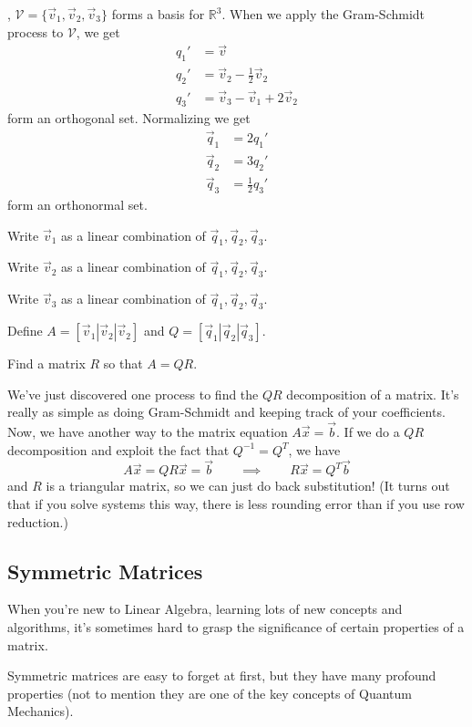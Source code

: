 \documentclass{article}
\newcommand{\R}{\mathbb{R}}
\begin{document}
	\sep
	$\mathcal V=\{\vec v_1,\vec v_2,\vec v_3\}$ forms a basis for $\R^3$.
	When we apply the Gram-Schmidt process to $\mathcal V$, we get
	\[
		\begin{array}{rl}
			q_1' &=\vec v\\
			q_2' &= \vec v_2-\frac{1}{2}\vec v_2\\
			q_3' &= \vec v_3-\vec v_1+2\vec v_2
		\end{array}
	\]
	form an orthogonal set.  Normalizing we get
	\[
		\begin{array}{rl}
			\vec q_1 &= 2q_1'\\
			\vec q_2 &= 3q_2'\\
			\vec q_3 &=\frac{1}{2}q_3'
		\end{array}
	\]
	form an orthonormal set.
	\begin{Enum}
		\item Write $\vec v_1$ as a linear combination of $\vec q_1,\vec q_2,\vec q_3$.
		\item Write $\vec v_2$ as a linear combination of $\vec q_1,\vec q_2,\vec q_3$.
		\item Write $\vec v_3$ as a linear combination of $\vec q_1,\vec q_2,\vec q_3$.
	\end{Enum}
	Define $A=[\vec v_1|\vec v_2|\vec v_2]$ and $Q=[\vec q_1|\vec q_2|\vec q_3]$.
	\begin{Enum}[resume]
		\item Find a matrix $R$ so that $A=QR$.
	\end{Enum}
	
	We've just discovered one process to find the $QR$ decomposition of a matrix.
	It's really as simple as doing Gram-Schmidt and keeping track of your coefficients.
	Now, we have another way to the matrix equation $A\vec x=\vec b$.  If we do a $QR$
	decomposition and exploit the fact that $Q^{-1}=Q^T$, we have
	\[
		A\vec x=QR\vec x=\vec b\qquad\implies\qquad R\vec x=Q^T\vec b
	\]
	and $R$ is a triangular matrix, so we can just do back substitution! (It turns
	out that if you solve systems this way, there is less rounding error than if you
	use row reduction.)

\subsection*{Symmetric Matrices}
	When you're new to Linear Algebra, learning lots of new concepts and algorithms,
	it's sometimes hard to grasp the significance of certain properties of a matrix.

	Symmetric matrices are easy to forget at first, but they have many profound 
	properties (not to mention they are one of the key concepts of Quantum Mechanics).
\end{document}

